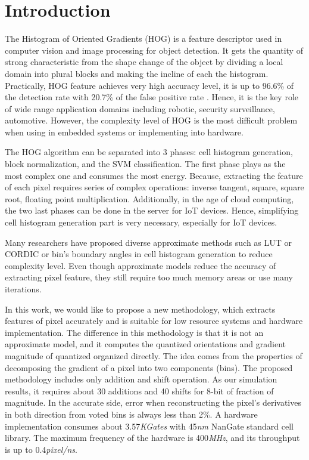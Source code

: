 %
%

\section{Introduction}
\label{sec:introduction}
The Histogram of Oriented Gradients (HOG) \cite{dalal2005hog} is a feature descriptor used in
computer vision and image processing for object detection.
It gets the quantity of strong characteristic from the shape change of the object by
dividing a local domain into plural blocks and making the incline of each the
histogram.
Practically, HOG feature achieves very high accuracy level,  it is up to
96.6\% of the detection rate with 20.7\% of the false positive rate
\cite{negi2011dpo}.
Hence, it is the key role of wide  range application domains including robotic,
security surveillance, automotive.
However,  the complexity level of HOG is the most difficult problem when
using in embedded systems or implementing into hardware.


The HOG algorithm can be separated into 3 phases: cell histogram generation,
block normalization, and the SVM classification.
The first phase plays as the most complex one and consumes the most energy.
Because, extracting the feature of each pixel requires series of  complex
operations: inverse tangent, square, square root, floating point multiplication.
Additionally, in the age of cloud computing, the two last phases can be done in the
server  for IoT devices.
Hence, simplifying cell histogram generation part is  very necessary,
especially for IoT devices.

Many researchers have proposed diverse approximate methods such as LUT or CORDIC
or bin's boundary angles in cell histogram generation to reduce complexity
level.
Even though approximate models reduce the  accuracy of extracting pixel feature,
they still require too much memory areas or use many iterations.

%
In this work, we  would like to propose a new methodology, which extracts
features of pixel accurately and is suitable for low resource systems and
hardware implementation.
The difference in this methodology is that it is not an approximate model, and it
computes the quantized orientations and gradient magnitude of quantized organized directly.
The idea comes from the properties of decomposing the gradient of a pixel into
two components (bins).
The proposed methodology includes only addition and shift operation.
As our simulation results, it requires about 30 additions
and 40 shifts for 8-bit of fraction of magnitude.
In the accurate side, error when reconstructing the pixel's derivatives in both
direction from voted bins is always less than 2\%.
A hardware implementation  consumes about 3.57\textit{KGates} with 45\textit{nm}
NanGate standard cell library.
The maximum frequency of the hardware is 400\textit{MHz}, and its throughput is up to 0.4\textit{pixel/ns}.


